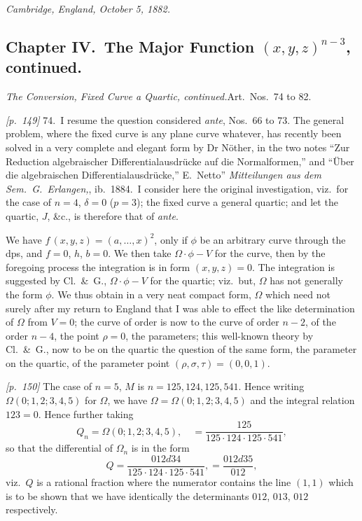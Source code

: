 \documentclass[11pt,a4paper]{book}
\begin{document}
\textit{Cambridge, England, October 5, 1882.}

\bigskip

\subsection*{Chapter IV.\ The Major Function $(x, y, z)^{n - 3}$, continued.}

\textit{The Conversion, Fixed Curve a Quartic, continued.}\quad Art.\ Nos.~74 to 82.

\noindent\textit{[p.~149]} 74.\ I resume the question considered \textit{ante}, Nos.~66 to 73. The general problem, where the fixed curve is any plane curve whatever, has recently been solved in a very complete and elegant form by Dr Nöther, in the two notes ``Zur Reduction algebraischer Differentialausdrücke auf die Normalformen,'' and ``Über die algebraischen Differentialausdrücke,'' E.\ Netto'' \textit{Mitteilungen aus dem Sem.\ G.\ Erlangen,}, ib.\ 1884.\ I consider here the original investigation, viz.\ for the case of $n = 4$, $\delta = 0$ ($p = 3$); the fixed curve a general quartic; and let the quartic, $J$, \&c., is therefore that of \textit{ante}.

We have $f\,(x, y, z) = (a, \ldots, x)^2$, only if $\phi$ be an arbitrary curve through the dps, and $f = 0$, $h$, $b = 0$. We then take $\Omega \cdot \phi - V$ for the curve, then by the foregoing process the integration is in form $(x, y, z) = 0$. The integration is suggested by Cl.\ \&\ G., $\Omega \cdot \phi - V$ for the quartic; viz.\ but, $\Omega$ has not generally the form $\phi$. We thus obtain in a very neat compact form, $\Omega$ which need not surely after my return to England that I was able to effect the like determination of $\Omega$ from $V = 0$; the curve of order is now to the curve of order $n - 2$, of the order $n - 4$, the point $\rho = 0$, the parameters; this well-known theory by Cl.\ \&\ G., now to be on the quartic the question of the same form, the parameter on the quartic, of the parameter point $(\rho, \sigma, \tau) = (0, 0, 1)$.

\bigskip\noindent\textit{[p.~150]} The case of $n = 5$, $M$ is $n = 125, 124, 125, 541$. Hence writing $\Omega(0; 1, 2; 3, 4, 5)$ for $\Omega$, we have $\Omega = \Omega(0; 1, 2; 3, 4, 5)$ and the integral relation $123 = 0$. Hence further taking
\[
Q_n = \Omega(0; 1, 2; 3, 4, 5),\quad =\frac{125}{125 \cdot 124 \cdot 125 \cdot 541},
\]
so that the differential of $\Omega_n$ is in the form
\[
Q = \frac{012 d34}{125 \cdot 124 \cdot 125 \cdot 541}, =\frac{012 d35}{012},
\]
viz.\ $Q$ is a rational fraction where the numerator contains the line $(1, 1)$ which is to be shown that we have identically the determinants $012$, $013$, $012$ respectively.
\end{document}
